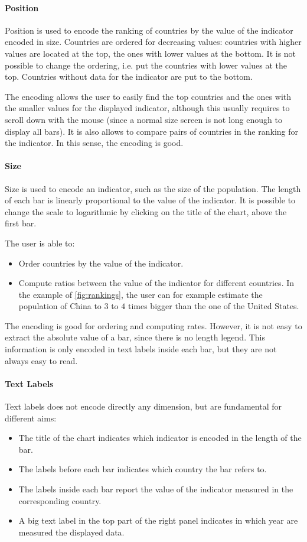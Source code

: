 \paragraph{Position}
Position is used to encode the ranking of countries by the value of the indicator encoded in size.
Countries are ordered for decreasing values:
countries with higher values are located at the top, the ones with lower values at the bottom.
It is not possible to change the ordering, i.e. put the countries with lower values at the top.
Countries without data for the indicator are put to the bottom.

The encoding allows the user to easily find the top countries and the ones with the smaller values for the displayed indicator, although this usually requires to scroll down with the mouse (since a normal size screen is not long enough to display all bars).
It is also allows to compare pairs of countries in the ranking for the indicator.
In this sense, the encoding is good.

\paragraph{Size}
Size is used to encode an indicator, such as the size of the population.
The length of each bar is linearly proportional to the value of the indicator.
It is possible to change the scale to logarithmic by clicking on the title of the chart, above the first bar.

The user is able to:
\begin{itemize}
	\item Order countries by the value of the indicator.
	\item Compute ratios between the value of the indicator for different countries. In the example of \cref{fig:rankings}, the user can for example estimate the population of China to $3$ to $4$ times bigger than the one of the United States.
\end{itemize}

The encoding is good for ordering and computing rates.
However, it is not easy to extract the absolute value of a bar, since there is no length legend.
This information is only encoded in text labels inside each bar, but they are not always easy to read.

\paragraph{Text Labels}
Text labels does not encode directly any dimension, but are fundamental for different aims:
\begin{itemize}
	\item The title of the chart indicates which indicator is encoded in the length of the bar.
	\item The labels before each bar indicates which country the bar refers to.
	\item The labels inside each bar report the value of the indicator measured in the corresponding country.
	\item A big text label in the top part of the right panel indicates in which year are measured the displayed data.
\end{itemize}


